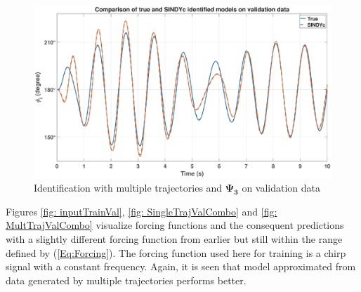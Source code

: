 % 
\begin{figure}[ht]
    \centering
    \includegraphics[width=1\linewidth]{figures/MultTrajVal_2_0_1}
    \caption{Identification with multiple trajectories and $\mathbf{\Psi_3}$ on validation data}
    \label{fig: MultTrajVal}
\end{figure}
% 
\newpage
Figures \ref{fig: inputTrainVal}, \ref{fig: SingleTrajValCombo} and \ref{fig: MultTrajValCombo} visualize forcing functions and the consequent predictions with a slightly different forcing function from earlier but still within the range defined by (\ref{Eq:Forcing}). The forcing function used here for training is a chirp signal with a constant frequency. Again, it is seen that model approximated from data generated by multiple trajectories performs better.
